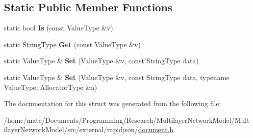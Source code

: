 \subsection*{Static Public Member Functions}
\begin{DoxyCompactItemize}
\item 
static bool {\bfseries Is} (const Value\+Type \&v)\hypertarget{structinternal_1_1TypeHelper_3_01ValueType_00_01const_01typename_01ValueType_1_1Ch_01_5_01_4_a9543f180b6ac2b923486f1b69d5356ea}{}\label{structinternal_1_1TypeHelper_3_01ValueType_00_01const_01typename_01ValueType_1_1Ch_01_5_01_4_a9543f180b6ac2b923486f1b69d5356ea}

\item 
static String\+Type {\bfseries Get} (const Value\+Type \&v)\hypertarget{structinternal_1_1TypeHelper_3_01ValueType_00_01const_01typename_01ValueType_1_1Ch_01_5_01_4_a11f8ddfbc91f1d890d63cc67e3f1abb6}{}\label{structinternal_1_1TypeHelper_3_01ValueType_00_01const_01typename_01ValueType_1_1Ch_01_5_01_4_a11f8ddfbc91f1d890d63cc67e3f1abb6}

\item 
static Value\+Type \& {\bfseries Set} (Value\+Type \&v, const String\+Type data)\hypertarget{structinternal_1_1TypeHelper_3_01ValueType_00_01const_01typename_01ValueType_1_1Ch_01_5_01_4_af3a44a3b6f485a71a73af69d30668c8f}{}\label{structinternal_1_1TypeHelper_3_01ValueType_00_01const_01typename_01ValueType_1_1Ch_01_5_01_4_af3a44a3b6f485a71a73af69d30668c8f}

\item 
static Value\+Type \& {\bfseries Set} (Value\+Type \&v, const String\+Type data, typename Value\+Type\+::\+Allocator\+Type \&a)\hypertarget{structinternal_1_1TypeHelper_3_01ValueType_00_01const_01typename_01ValueType_1_1Ch_01_5_01_4_a8588f2ab1d0ffbb4c1810d60a500a8c5}{}\label{structinternal_1_1TypeHelper_3_01ValueType_00_01const_01typename_01ValueType_1_1Ch_01_5_01_4_a8588f2ab1d0ffbb4c1810d60a500a8c5}

\end{DoxyCompactItemize}


The documentation for this struct was generated from the following file\+:\begin{DoxyCompactItemize}
\item 
/home/mate/\+Documents/\+Programming/\+Research/\+Multilayer\+Network\+Model/\+Multilayer\+Network\+Model/src/external/rapidjson/\hyperlink{document_8h}{document.\+h}\end{DoxyCompactItemize}
